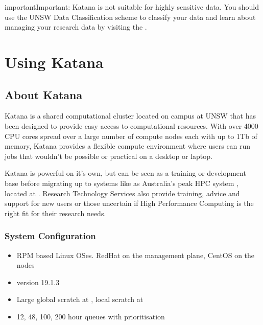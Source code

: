 \documentclass[letterpaper,10pt,english]{sphinxmanual}
\begin{document}
\begin{sphinxadmonition}{important}{Important:}
Katana is not suitable for highly sensitive data. You should use the UNSW Data Classification scheme to classify your data and learn about managing your research data by visiting the .
\end{sphinxadmonition}


\chapter{Using Katana}
\label{\detokenize{using_katana/index:using-katana}}\label{\detokenize{using_katana/index:katana}}\label{\detokenize{using_katana/index::doc}}

\section{About Katana}
\label{\detokenize{using_katana/about_katana:about-katana}}\label{\detokenize{using_katana/about_katana:id1}}\label{\detokenize{using_katana/about_katana::doc}}
Katana is a shared computational cluster located on campus at UNSW that has been designed to provide easy access to computational resources. With over 4000 CPU cores spread over a large number of compute nodes each with up to 1Tb of memory, Katana provides a flexible compute environment where users can run jobs that wouldn’t be possible or practical on a desktop or laptop.

Katana is powerful on it’s own, but can be seen as a training or development base before migrating up to systems like as Australia’s peak HPC system , located at . Research Technology Services also provide training, advice and support for new users or those uncertain if High Performance Computing is the right fit for their research needs.


\subsection{System Configuration}
\label{\detokenize{using_katana/about_katana:system-configuration}}\label{\detokenize{using_katana/about_katana:id2}}\begin{itemize}
\item {} 
RPM based Linux OSes. RedHat on the management plane, CentOS on the nodes

\item {} 
 version 19.1.3

\item {} 
Large global scratch at , local scratch at 

\item {} 
12, 48, 100, 200 hour {\hyperref[\detokenize{glossary:term-Walltime}]{}} queues with prioritisation

\end{itemize}
\end{document}
